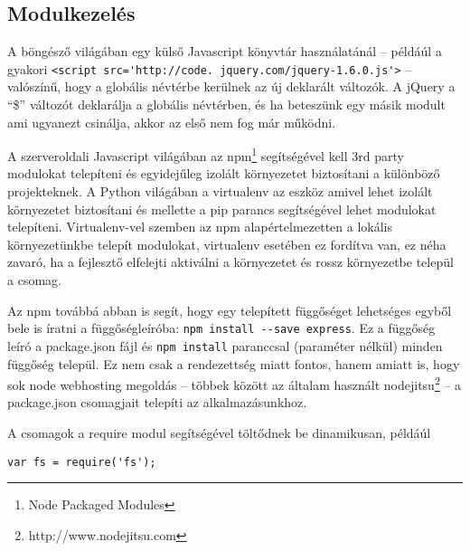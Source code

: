 \subsection{Modulkezelés}

A böngésző világában egy külső Javascript könyvtár használatánál -- példáúl a gyakori \lstinline|<script src='http://code. jquery.com/jquery-1.6.0.js'>| -- valószínű, hogy a globális névtérbe kerülnek az új deklarált változók. A jQuery a ``\$'' változót deklarálja a globális névtérben, és ha beteszünk egy másik modult ami ugyanezt csinálja, akkor az első nem fog már működni. 


A szerveroldali Javascript világában az npm\footnote{Node Packaged Modules} segítségével kell 3rd party modulokat telepíteni és egyidejűleg izolált környezetet biztosítani a különböző projekteknek. A Python világában a virtualenv az eszköz amivel lehet izolált környezetet biztosítani és mellette a pip parancs segítségével lehet modulokat telepíteni. Virtualenv-vel szemben az npm alapértelmezetten a lokális környezetünkbe telepít modulokat, virtualenv esetében ez fordítva van, ez néha zavaró, ha a fejlesztő elfelejti aktiválni a környezetet és rossz környezetbe települ a csomag.

Az npm továbbá abban is segít, hogy egy telepített függőséget lehetséges egyből bele is íratni a függőségleíróba:
\lstset{language=bash}   
\lstinline{npm install --save express}.
Ez a függőség leíró a package.json fájl és \lstinline{npm install} paranccsal (paraméter nélkül) minden függőség települ. Ez nem csak a rendezettség miatt fontos, hanem amiatt is, hogy sok node webhosting megoldás -- többek között az általam használt nodejitsu\footnote{http://www.nodejitsu.com} -- a package.json csomagjait telepíti az alkalmazásunkhoz.   

A csomagok a require modul segítségével töltődnek be dinamikusan, példáúl
\begin{lstlisting}
var fs = require('fs');
\end{lstlisting}

